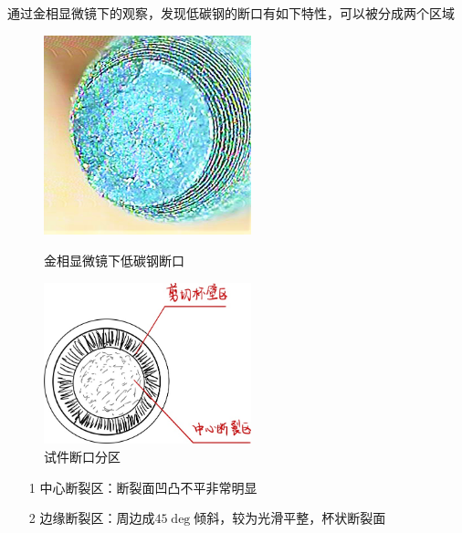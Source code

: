 \documentclass[12pt, a4paper]{ctexart}
\begin{document}
通过金相显微镜下的观察，发现低碳钢的断口有如下特性，可以被分成两个区域
\begin{figure}[htbp]
	\centering
	\begin{minipage}[t]{0.48\textwidth}
		\centering
		\includegraphics[width=6cm]{41.png}
		\caption{金相显微镜下低碳钢断口}
	\end{minipage}
	\begin{minipage}[t]{0.48\textwidth}
		\centering
		\includegraphics[width=6cm]{42.jpg}
		\caption{试件断口分区}
	\end{minipage}
\end{figure}
\begin{enumerate}
	\item[1] 中心断裂区：断裂面凹凸不平非常明显
	\item[2] 边缘断裂区：周边成$45\deg$倾斜，较为光滑平整，杯状断裂面
\end{enumerate}
\end{document}
